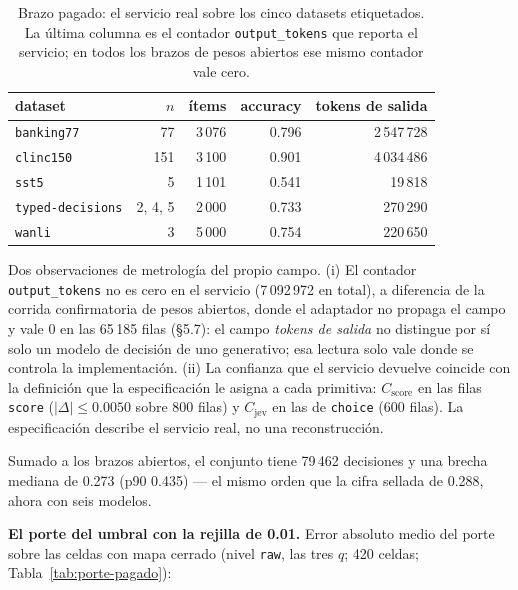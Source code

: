 \begin{table}[t]
\centering
\caption{Brazo pagado: el servicio real sobre los cinco datasets etiquetados. La última columna es el contador
\texttt{output\_tokens} que reporta el servicio; en todos los brazos de pesos abiertos ese mismo contador vale
cero.}
\label{tab:brazo-pagado}
{\footnotesize
\setlength{\tabcolsep}{4pt}
\begin{tabular}{@{}lrrrr@{}}
\toprule
dataset & $n$ & ítems & accuracy & tokens de salida \\
\midrule
\texttt{banking77} & 77 & 3\,076 & 0.796 & 2\,547\,728 \\
\texttt{clinc150} & 151 & 3\,100 & 0.901 & 4\,034\,486 \\
\texttt{sst5} & 5 & 1\,101 & 0.541 & 19\,818 \\
\texttt{typed-decisions} & 2, 4, 5 & 2\,000 & 0.733 & 270\,290 \\
\texttt{wanli} & 3 & 5\,000 & 0.754 & 220\,650 \\
\bottomrule
\end{tabular}}
\end{table}

Dos observaciones de metrología del propio campo. (i) El contador \texttt{output\_tokens} no es cero en
el servicio (7\,092\,972 en total), a diferencia de la corrida confirmatoria de pesos abiertos, donde el
adaptador no propaga el campo y vale 0 en las 65\,185 filas (§5.7): el campo \emph{tokens de
salida} no distingue por sí solo un modelo de decisión de uno generativo; esa lectura solo vale donde se controla
la implementación. (ii) La confianza que el servicio devuelve coincide con la definición que la
especificación le asigna a cada primitiva: $C_{\text{score}}$ en las filas \texttt{score} ($\lvert\Delta\rvert
\le 0.0050$ sobre 800 filas) y $C_{\text{jev}}$ en las de \texttt{choice} (600 filas). La especificación describe
el servicio real, no una reconstrucción.

Sumado a los brazos abiertos, el conjunto tiene 79\,462 decisiones y una brecha mediana de
0.273 (p90 0.435) --- el mismo orden que la cifra sellada de 0.288, ahora con seis modelos.

\textbf{El porte del umbral con la rejilla de 0.01.} Error absoluto medio del porte sobre las celdas con mapa
cerrado (nivel \texttt{raw}, las tres $q$; 420 celdas; Tabla~\ref{tab:porte-pagado}):

